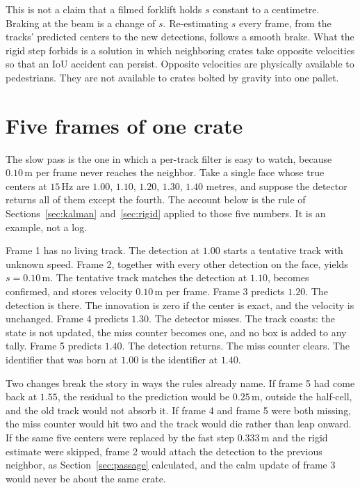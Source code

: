 \documentclass[11pt,a4paper]{article}
\begin{document}
This is not a claim that a filmed forklift holds $s$ constant to a centimetre. Braking at the beam is a change of $s$. Re-estimating $s$ every frame, from the tracks' predicted centers to the new detections, follows a smooth brake. What the rigid step forbids is a solution in which neighboring crates take opposite velocities so that an IoU accident can persist. Opposite velocities are physically available to pedestrians. They are not available to crates bolted by gravity into one pallet.

\section{Five frames of one crate}

The slow pass is the one in which a per-track filter is easy to watch, because $0.10\,\mathrm{m}$ per frame never reaches the neighbor. Take a single face whose true centers at $15\,\mathrm{Hz}$ are $1.00$, $1.10$, $1.20$, $1.30$, $1.40$ metres, and suppose the detector returns all of them except the fourth. The account below is the rule of Sections~\ref{sec:kalman} and~\ref{sec:rigid} applied to those five numbers. It is an example, not a log.

Frame 1 has no living track. The detection at $1.00$ starts a tentative track with unknown speed. Frame 2, together with every other detection on the face, yields $s=0.10\,\mathrm{m}$. The tentative track matches the detection at $1.10$, becomes confirmed, and stores velocity $0.10\,\mathrm{m}$ per frame. Frame 3 predicts $1.20$. The detection is there. The innovation is zero if the center is exact, and the velocity is unchanged. Frame 4 predicts $1.30$. The detector misses. The track coasts: the state is not updated, the miss counter becomes one, and no box is added to any tally. Frame 5 predicts $1.40$. The detection returns. The miss counter clears. The identifier that was born at $1.00$ is the identifier at $1.40$.

Two changes break the story in ways the rules already name. If frame 5 had come back at $1.55$, the residual to the prediction would be $0.25\,\mathrm{m}$, outside the half-cell, and the old track would not absorb it. If frame 4 and frame 5 were both missing, the miss counter would hit two and the track would die rather than leap onward. If the same five centers were replaced by the fast step $0.333\,\mathrm{m}$ and the rigid estimate were skipped, frame 2 would attach the detection to the previous neighbor, as Section~\ref{sec:passage} calculated, and the calm update of frame 3 would never be about the same crate.
\end{document}
